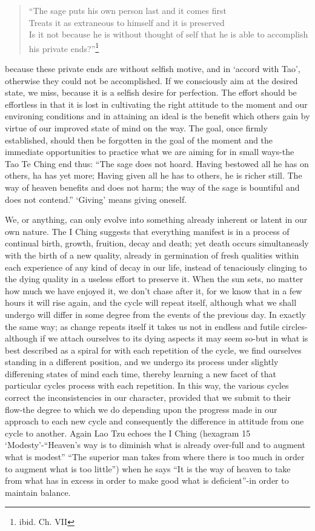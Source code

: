 \documentclass[11pt]{book}
\begin{document}
\begin{quote}
  ``The sage puts his own person last and it comes first\\
   Treats it as extraneous to himself and it is preserved\\
   Is it not because he is without thought of self that he is able to accomplish his private ends?''\footnote{ibid. Ch. VII}
\end{quote}

because these private ends are without selfish motive, and in `accord with Tao', otherwise they could not be accomplished. If we consciously aim at the desired state, we miss, because it is a selfish desire for perfection. The effort should be effortless in that it is lost in cultivating the right attitude to the moment and our environing conditions and in attaining an ideal is the benefit which others gain by virtue of our improved state of mind on the way. The goal, once firmly established, should then be forgotten in the goal of the moment and the immediate opportunities to practice what we are aiming for in small ways-the Tao Te Ching end thus: ``The sage does not hoard. Having bestowed all he has on others, ha has yet more; Having given all he has to others, he is richer still. The way of heaven benefits and does not harm; the way of the sage is bountiful and does not contend.'' `Giving' means giving oneself.

We, or anything, can only evolve into something already inherent or latent in our own nature. The I Ching suggests that everything manifest is in a process of continual birth, growth, fruition, decay and death; yet death occurs simultaneasly with the birth of a new quality, already in germination of fresh qualities within each experience of any kind of decay in our life, instead of tenaciously clinging to the dying quality in a useless effort to preserve it. When the sun sets, no matter how much we have enjoyed it, we don't chase after it, for we know that in a few hours it will rise again, and the cycle will repeat itself, although what we shall undergo will differ in some degree from the events of the previous day. In exactly the same way; as change repeats itself it takes us not in endless and futile circles-although if we attach ourselves to its dying aspects it may seem so-but in what is best described as a spiral for with each repetition of the cycle, we find ourselves standing in a different position, and we undergo its process under slightly differening states of mind each time, thereby learning a new facet of that particular cycles process with each repetition. In this way, the various cycles correct the inconsistencies in our character, provided that we submit to their flow-the degree to which we do depending upon the progress made in our approach to each new cycle and consequently the difference in attitude from one cycle to another. Again Lao Tzu echoes the I Ching (hexagram 15 `Modesty'-``Heaven's way is to diminish what is already over-full and to augment what is modest'' ``The superior man takes from where there is too much in order to augment what is too little'') when he says ``It is the way of heaven to take from what has in excess in order to make good what is deficient''-in order to maintain balance.
\end{document}
